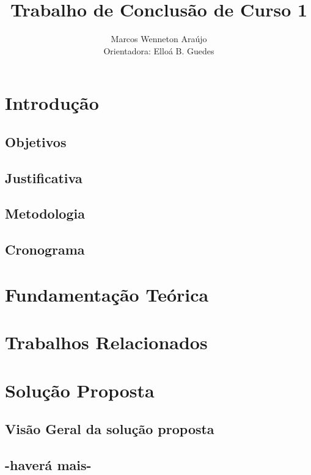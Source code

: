 \documentclass[12pt]{article}
\title{Trabalho de Conclusão de Curso 1}
\author{Marcos Wenneton Araújo\\
Orientadora: Elloá B. Guedes}
\begin{document}
\maketitle
\pagestyle{plain} %

\section{Introdução} \label{sec:introducao}

\subsection{Objetivos}

\subsection{Justificativa}

\subsection{Metodologia}

\subsection{Cronograma}

\section{Fundamentação Teórica} \label{sec:fund-teor}



\section{Trabalhos Relacionados} \label{sec:trab-rel}



\section{Solução Proposta} \label{sec:sol-prop}

\subsection{Visão Geral da solução proposta}

\subsection{-haverá mais-}
\end{document}
